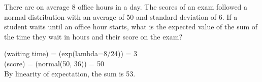 \question There are on average 8 office hours in a day. The scores of an exam 
followed a normal distribution with an average of 50 and standard 
deviation of 6. If a student waits until an office hour starts, what 
is the expected value of the sum of the time they wait in hours and 
their score on the exam?

\begin{solution}[0.5cm]
\E(waiting time) = \E(exp(lambda=8/24)) = 3 \\
\E(score) = \E(normal(50, 36)) = 50 \\
By linearity of expectation, the sum is 53.
\end{solution}
 
